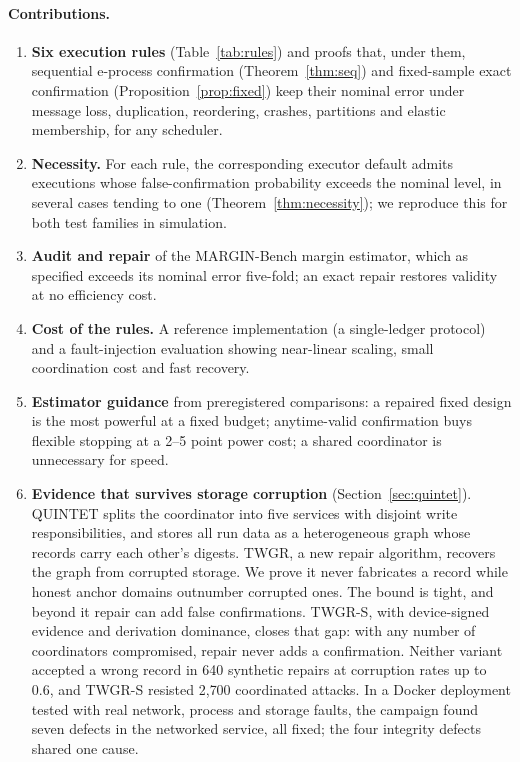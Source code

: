 \documentclass[11pt]{article}
\theoremstyle{definition}
\begin{document}
\paragraph{Contributions.}
\begin{enumerate}
\item[C1] \textbf{Six execution rules} (Table~\ref{tab:rules}) and proofs that, under them, sequential e-process confirmation (Theorem~\ref{thm:seq}) and fixed-sample exact confirmation (Proposition~\ref{prop:fixed}) keep their nominal error under message loss, duplication, reordering, crashes, partitions and elastic membership, for any scheduler.
\item[C2] \textbf{Necessity.} For each rule, the corresponding executor default admits executions whose false-confirmation probability exceeds the nominal level, in several cases tending to one (Theorem~\ref{thm:necessity}); we reproduce this for both test families in simulation.
\item[C3] \textbf{Audit and repair} of the MARGIN-Bench margin estimator, which as specified exceeds its nominal error five-fold; an exact repair restores validity at no efficiency cost.
\item[C4] \textbf{Cost of the rules.} A reference implementation (a single-ledger protocol) and a fault-injection evaluation showing near-linear scaling, small coordination cost and fast recovery.
\item[C5] \textbf{Estimator guidance} from preregistered comparisons: a repaired fixed design is the most powerful at a fixed budget; anytime-valid confirmation buys flexible stopping at a 2--5 point power cost; a shared coordinator is unnecessary for speed.
\item[C6] \textbf{Evidence that survives storage corruption} (Section~\ref{sec:quintet}). QUINTET splits the coordinator into five services with disjoint write responsibilities, and stores all run data as a heterogeneous graph whose records carry each other's digests. TWGR, a new repair algorithm, recovers the graph from corrupted storage. We prove it never fabricates a record while honest anchor domains outnumber corrupted ones. The bound is tight, and beyond it repair can add false confirmations. TWGR-S, with device-signed evidence and derivation dominance, closes that gap: with any number of coordinators compromised, repair never adds a confirmation. Neither variant accepted a wrong record in 640 synthetic repairs at corruption rates up to 0.6, and TWGR-S resisted 2{,}700 coordinated attacks. In a Docker deployment tested with real network, process and storage faults, the campaign found seven defects in the networked service, all fixed; the four integrity defects shared one cause.
\end{enumerate}
\end{document}
